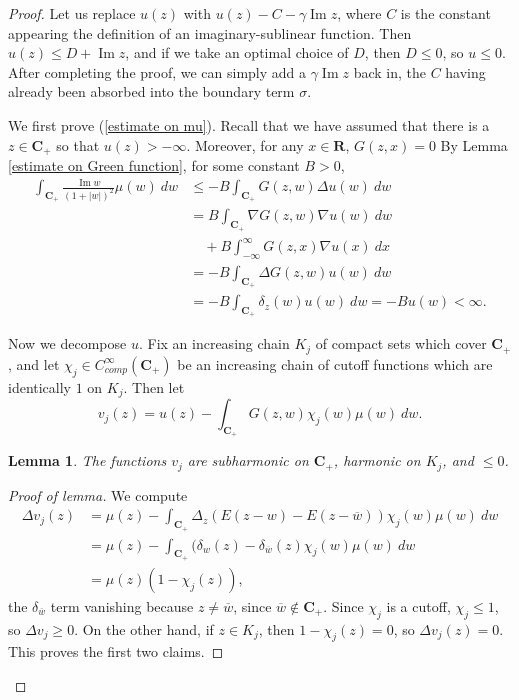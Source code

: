 \documentclass[12pt]{report}
\newcommand{\RR}{\mathbf{R}}
\newcommand{\CC}{\mathbf{C}}
\renewcommand{\Im}{\operatorname{Im}}
\newtheorem{lemma}[theorem]{Lemma}
\theoremstyle{definition}
\begin{document}
\begin{proof}
    Let us replace $u(z)$ with $u(z) - C - \gamma \Im z$, where $C$ is the constant appearing the definition of an imaginary-sublinear function. Then $u(z) \leq D + \Im z$, and if we take an optimal choice of $D$, then $D \leq 0$, so $u \leq 0$. After completing the proof, we can simply add a $\gamma \Im z$ back in, the $C$ having already been absorbed into the boundary term $\sigma$.

    We first prove (\ref{estimate on mu}). Recall that we have assumed that there is a $z \in \CC_+$ so that $u(z) > -\infty$. Moreover, for any $x \in \RR$, $G(z, x) = 0$ By Lemma \ref{estimate on Green function}, for some constant $B > 0$,
\begin{align*}\int_{\CC_+} \frac{\Im w}{(1 + |w|)^2} \mu(w) ~dw &\leq -B\int_{\CC_+} G(z, w) \Delta u(w) ~dw
    \\&= B \int_{\CC_+} \nabla G(z, w) \nabla u(w) ~dw \\
      &\quad+ B\int_{-\infty}^\infty G(z, x) \nabla u(x) ~dx\\
    &= -B \int_{\CC_+} \Delta G(z, w) u(w) ~dw \\&= -B\int_{\CC_+} \delta_z(w) u(w) ~dw = -Bu(w) < \infty.
  \end{align*}

    Now we decompose $u$. Fix an increasing chain $K_j$ of compact sets which cover $\CC_+$, and let $\chi_j \in C^\infty_{comp}(\CC_+)$ be an increasing chain of cutoff functions which are identically $1$ on $K_j$. Then let
    $$v_j(z) = u(z) - \int_{\CC_+} G(z, w) \chi_j(w)\mu(w) ~dw.$$
\begin{lemma}
    The functions $v_j$ are subharmonic on $\CC_+$, harmonic on $K_j$, and $\leq 0$.
\end{lemma}
\begin{proof}[Proof of lemma]
    We compute
\begin{align*}
    \Delta v_j(z) &= \mu(z) - \int_{\CC_+} \Delta_z(E(z - w) - E(z - \overline w)) \chi_j(w) \mu(w) ~dw \\&= \mu(z) - \int_{\CC_+} (\delta_w(z) - \delta_{\overline w}(z) \chi_j(w) \mu(w) ~dw \\&= \mu(z)(1 - \chi_j(z)),
\end{align*}
    the $\delta_{\overline w}$ term vanishing because $z \neq \overline w$, since $\overline w \notin \CC_+$. Since $\chi_j$ is a cutoff, $\chi_j \leq 1$, so $\Delta v_j \geq 0$. On the other hand, if $z \in K_j$, then $1 - \chi_j(z) = 0$, so $\Delta v_j(z) = 0$. This proves the first two claims.


\end{proof}
\end{proof}
\end{document}
